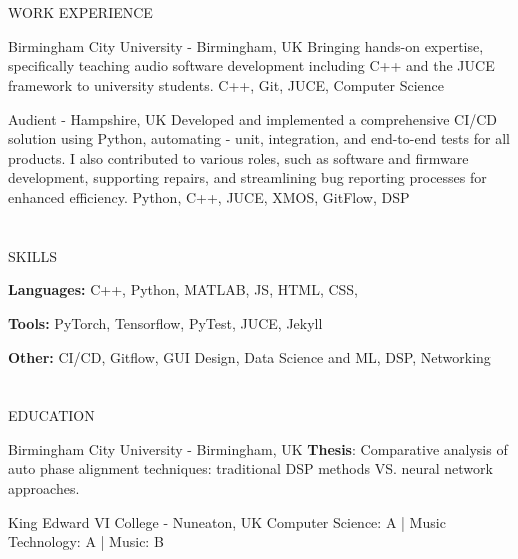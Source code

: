 \documentclass{my_cv}
\begin{document}
\begin{multicols}{2}
\section{\faPencil}{WORK EXPERIENCE}

%
    {Birmingham City University - Birmingham, UK}%
    {Bringing hands-on expertise, specifically teaching audio software development including C++ and the JUCE framework to university students.}%
    {C++, Git, JUCE, Computer Science}
    
%
    {Audient - Hampshire, UK}%
    {Developed and implemented a comprehensive CI/CD solution using Python, automating - unit, integration, and end-to-end tests for all products. I also contributed to various roles, such as software and firmware development, supporting repairs, and streamlining bug reporting processes for enhanced efficiency.}
    {Python, C++, JUCE, XMOS, GitFlow, DSP}
    
\section{\faList}{SKILLS}

\textbf{Languages:} C++, Python, MATLAB, JS, HTML, CSS,

\noindent\textbf{Tools:} PyTorch, Tensorflow, PyTest, JUCE, Jekyll

\noindent\textbf{Other:} CI/CD, Gitflow, GUI Design, Data Science and ML, DSP, Networking

\section{\faGraduationCap}{EDUCATION}
    
{Birmingham City University - Birmingham, UK} %
{\textbf{{Thesis}}: Comparative analysis of auto phase alignment techniques: traditional DSP methods VS. neural network approaches.}
    
{King Edward VI College - Nuneaton, UK} %
{Computer Science: A
| Music Technology: A
| Music: B}


\end{multicols}
\end{document}
